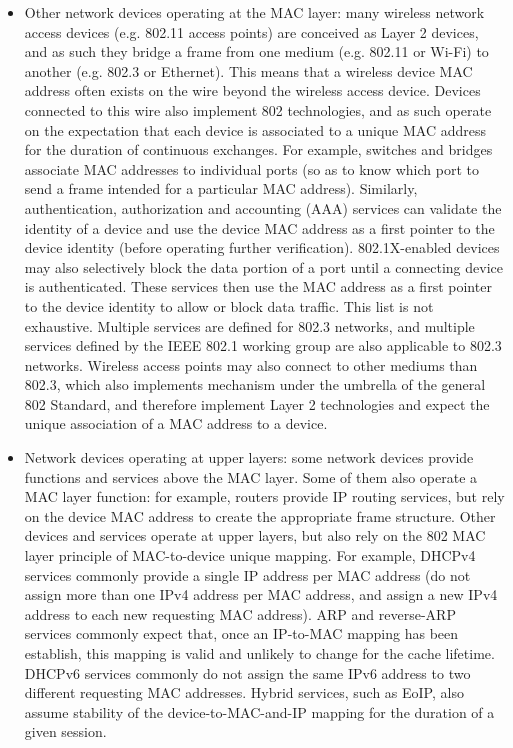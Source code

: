 \documentclass[10pt]{article}
\begin{document}
{{\begin{itemize}
	\item Other network devices operating at the MAC layer: many wireless network access devices (e.g. 802.11 access points) are conceived as Layer 2 devices, and as such they bridge a frame from one medium (e.g. 802.11 or Wi-Fi) to another (e.g. 802.3 or Ethernet). This means that a wireless device MAC address often exists on the wire beyond the wireless access device. Devices connected to this wire also implement 802 technologies, and as such operate on the expectation that each device is associated to a unique MAC address for the duration of continuous exchanges. For example, switches and bridges associate MAC addresses to individual ports (so as to know which port to send a frame intended for a particular MAC address). Similarly, authentication, authorization and accounting (AAA) services can validate the identity of a device and use the device MAC address as a first pointer to the device identity (before operating further verification). 802.1X-enabled devices may also selectively block the data portion of a port until a connecting device is authenticated. These services then use the MAC address as a first pointer to the device identity to allow or block data traffic. This list is not exhaustive. Multiple services are defined for 802.3 networks, and multiple services defined by the IEEE 802.1 working group are also applicable to 802.3 networks. Wireless access points may also connect to other mediums than 802.3, which also implements mechanism under the umbrella of the general 802 Standard, and therefore implement Layer 2 technologies and expect the unique association of a MAC address to a device.
	\item Network devices operating at upper layers: some network devices provide functions and services above the MAC layer. Some of them also operate a MAC layer function: for example, routers provide IP routing services, but rely on the device MAC address to create the appropriate frame structure. Other devices and services operate at upper layers, but also rely on the 802 MAC layer principle of MAC-to-device unique mapping. For example, DHCPv4 services commonly provide a single IP address per MAC address (do not assign more than one IPv4 address per MAC address, and assign a new IPv4 address to each new requesting MAC address). ARP and reverse-ARP services commonly expect that, once an IP-to-MAC mapping has been establish, this mapping is valid and unlikely to change for the cache lifetime. DHCPv6 services commonly do not assign the same IPv6 address to two different requesting MAC addresses. Hybrid services, such as EoIP, also assume stability of the device-to-MAC-and-IP mapping for the duration of a given session.
\end{itemize}
	}
	
}
\end{document}
